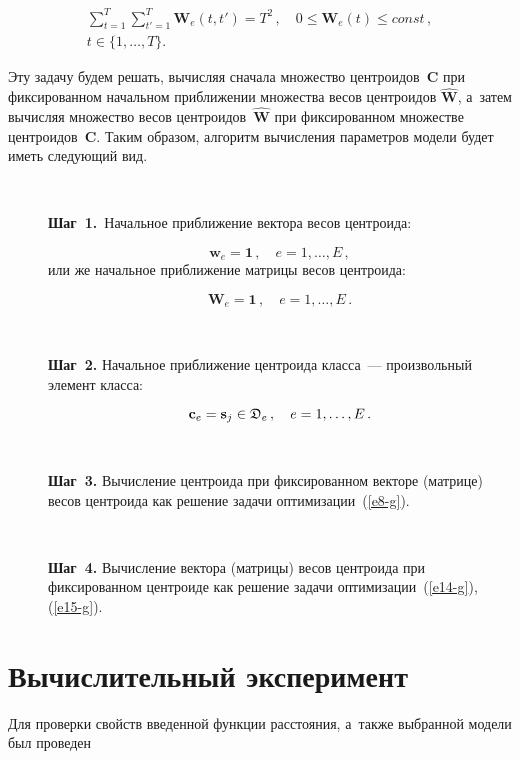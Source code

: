\begin{multicols}{2}
 \vspace*{-14pt}
 
 \noindent
\begin{multline*}
\sum\limits_{t=1}^T\sum\limits_{t'=1}^T
\mathbf{W}_e\left(t,t'\right) = T^2\,, \quad 0 \leq \mathbf{W}_e(t) \leq const\,, \\ 
t \in \{1,\ldots,T\}.
\end{multline*}

Эту задачу будем решать, вычисляя сначала множество центроидов~$\mathbf{C}$ при 
фиксированном начальном приближении множества весов центроидов $\hat{\mathbf{W}}$, 
а~затем вычисляя множество весов центроидов~$\hat{\mathbf{W}}$ при фиксированном 
множестве центроидов~$\mathbf{C}$.
Таким образом, алгоритм вычисления параметров модели будет иметь следующий вид.
\begin{description}
\item[\,] \textbf{Шаг~1.}\ Начальное приближение вектора весов центроида: 

\noindent 
$$
\mathbf{w}_e = \mathbf{1} \,, \quad e=1,\ldots,E\,,
$$
или же начальное приближение матрицы весов центроида: 

\noindent
$$
\mathbf{W}_e = \mathbf{1} \,, \quad e=1,\ldots,E\,.
$$
\item[\,] 
\textbf{Шаг~2.} Начальное приближение центроида класса~--- 
произвольный элемент класса:

\noindent 
$$
\mathbf{c}_e =  \mathbf{s}_j \in \mathfrak{D}_e \,,\quad e=1,\dots,E\,.
$$
\item[\,] 
\textbf{Шаг~3.} Вычисление центроида при фиксированном векторе 
(матрице) весов центроида как решение задачи оптимизации~(\ref{e8-g}).
\item[\,] 
\textbf{Шаг~4.} Вычисление вектора (матрицы) весов центроида при фиксированном 
центроиде как решение задачи оптимизации~(\ref{e14-g}), (\ref{e15-g}).
\end{description}

\vspace*{-6pt}

\section{Вычислительный эксперимент}

\vspace*{-2pt}


Для проверки свойств введенной функции расстояния, а~также выбранной модели был 
проведен

\columnbreak


\end{multicols}
